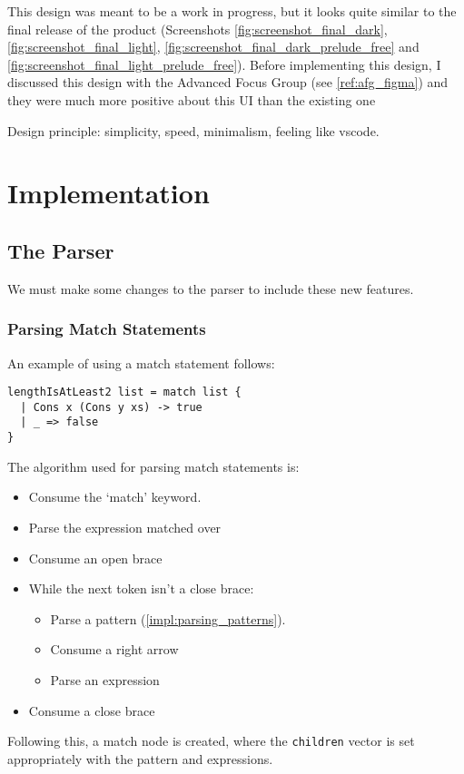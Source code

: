 This design was meant to be a work in progress, but it looks quite similar to the final release of the product (Screenshots \ref{fig:screenshot_final_dark}, \ref{fig:screenshot_final_light}, \ref{fig:screenshot_final_dark_prelude_free} and \ref{fig:screenshot_final_light_prelude_free}). Before implementing this design, I discussed this design with the Advanced Focus Group (see \ref{ref:afg_figma}) and they were much more positive about this UI than the existing one 

Design principle: simplicity, speed, minimalism, feeling like vscode.

\section{Implementation}
\subsection{The Parser}
We must make some changes to the parser to include these new features.

\subsubsection{Parsing Match Statements}
An example of using a match statement follows:
\begin{verbatim}
lengthIsAtLeast2 list = match list {
  | Cons x (Cons y xs) -> true
  | _ => false
}
\end{verbatim}

The algorithm used for parsing match statements is:
\begin{itemize}
    \item Consume the `match' keyword.
    \item Parse the expression matched over
    \item Consume an open brace
    \item While the next token isn't a close brace: \begin{itemize}
        \item Parse a pattern (\ref{impl:parsing_patterns}).
        \item Consume a right arrow
        \item Parse an expression
    \end{itemize}
    \item Consume a close brace
\end{itemize}
Following this, a match node is created, where the \verb|children| vector is set appropriately with the pattern and expressions.

